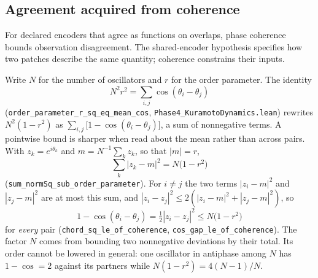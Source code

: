 \documentclass{article}
\begin{document}
\subsection{Agreement acquired from coherence}
\label{sec:coherence-agreement}

For declared encoders that agree as functions on overlaps, phase coherence
bounds observation disagreement. The shared-encoder hypothesis specifies how
two patches describe the same quantity; coherence constrains their inputs.

Write $N$ for the number of oscillators and $r$ for the order parameter. The
identity
\begin{equation}
 N^{2}r^{2}=\sum_{i,j}\cos(\theta_i-\theta_j)
 \label{eq:order-mean-cos}
\end{equation}
(\nolinkurl{order_parameter_r_sq_eq_mean_cos},
\nolinkurl{Phase4_KuramotoDynamics.lean}) rewrites $N^2(1-r^2)$ as
$\sum_{i,j}\bigl[1-\cos(\theta_i-\theta_j)\bigr]$, a sum of nonnegative terms.
A pointwise bound is sharper when read about the mean rather than across pairs.
With $z_k=e^{i\theta_k}$ and $m=N^{-1}\sum_kz_k$, so that $|m|=r$,
\begin{equation}
 \sum_k|z_k-m|^{2}=N\bigl(1-r^{2}\bigr)
 \label{eq:phasor-spread}
\end{equation}
(\nolinkurl{sum_normSq_sub_order_parameter}). For $i\neq j$ the two terms
$|z_i-m|^2$ and $|z_j-m|^2$ are at most this sum, and
$|z_i-z_j|^2\leq2(|z_i-m|^2+|z_j-m|^2)$, so
\begin{equation}
 1-\cos(\theta_i-\theta_j)=\tfrac12|z_i-z_j|^{2}\le N\bigl(1-r^{2}\bigr)
 \label{eq:cos-gap}
\end{equation}
for \emph{every} pair (\nolinkurl{chord_sq_le_of_coherence},
\nolinkurl{cos_gap_le_of_coherence}). The factor $N$ comes from bounding two
nonnegative deviations by their total. Its order cannot be lowered in general:
one oscillator in antiphase among $N$ has $1-\cos=2$ against its partners while
$N(1-r^2)=4(N-1)/N$.
\end{document}
